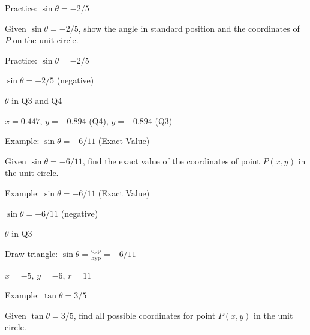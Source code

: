 \documentclass[aspectratio=169]{beamer}
\begin{document}
\begin{frame}{Practice: $\sin\theta = -2/5$}
    \begin{tcolorbox}[colback=lightgray,colframe=accent,title=Practice]
        \footnotesize
        Given $\sin\theta = -2/5$, show the angle in standard position and the coordinates of $P$ on the unit circle.
    \end{tcolorbox}
\end{frame}

\begin{frame}{Practice: $\sin\theta = -2/5$}
    \begin{tcolorbox}[colback=lightgray,colframe=accent,title=Solution]
        \footnotesize
        $\sin\theta = -2/5$ (negative)\par
        $\theta$ in Q3 and Q4\par
        $x = 0.447$, $y = -0.894$ (Q4), $y = -0.894$ (Q3)
    \end{tcolorbox}
\end{frame}

\begin{frame}{Example: $\sin\theta = -6/11$ (Exact Value)}
    \begin{tcolorbox}[colback=lightgray,colframe=primary,title=Question]
        \footnotesize
        Given $\sin\theta = -6/11$, find the exact value of the coordinates of point $P(x,y)$ in the unit circle.
    \end{tcolorbox}
\end{frame}

\begin{frame}{Example: $\sin\theta = -6/11$ (Exact Value)}
    \begin{tcolorbox}[colback=lightgray,colframe=primary,title=Solution]
        \footnotesize
        $\sin\theta = -6/11$ (negative)\par
        $\theta$ in Q3\par
        Draw triangle: $\sin\theta = \frac{\text{opp}}{\text{hyp}} = -6/11$\par
        $x = -5$, $y = -6$, $r = 11$
    \end{tcolorbox}
\end{frame}

\begin{frame}{Example: $\tan\theta = 3/5$}
    \begin{tcolorbox}[colback=lightgray,colframe=primary,title=Question]
        \footnotesize
        Given $\tan\theta = 3/5$, find all possible coordinates for point $P(x,y)$ in the unit circle.
    \end{tcolorbox}
\end{frame}
\end{document}
